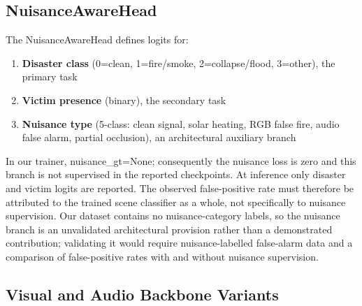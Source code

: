 \subsection{NuisanceAwareHead}

The NuisanceAwareHead defines logits for:
\begin{enumerate}
    \item \textbf{Disaster class} (0=clean, 1=fire/smoke, 2=collapse/flood, 3=other), the primary task
    \item \textbf{Victim presence} (binary), the secondary task
    \item \textbf{Nuisance type} (5-class: clean signal, solar heating, RGB false fire, audio false alarm, partial occlusion), an architectural auxiliary branch
\end{enumerate}

In our trainer, nuisance\_gt=None; consequently the nuisance loss is zero and this branch is not supervised in the reported checkpoints. At inference only disaster and victim logits are reported. The observed false-positive rate must therefore be attributed to the trained scene classifier as a whole, not specifically to nuisance supervision. Our dataset contains no nuisance-category labels, so the nuisance branch is an unvalidated architectural provision rather than a demonstrated contribution; validating it would require nuisance-labelled false-alarm data and a comparison of false-positive rates with and without nuisance supervision.

\subsection{Visual and Audio Backbone Variants}

